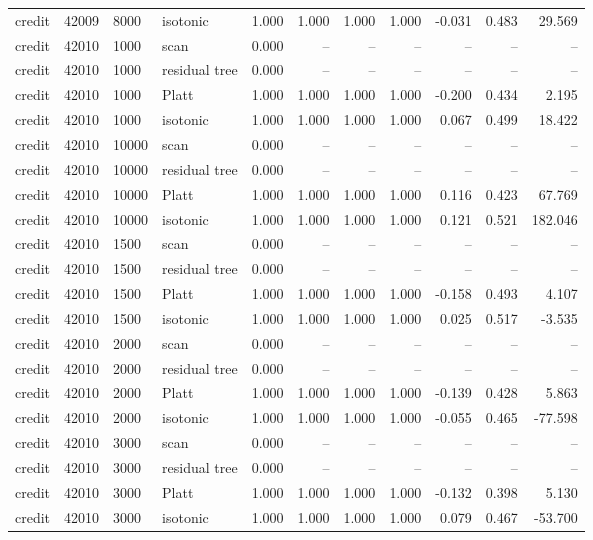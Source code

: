 \begin{tabular}{lrllrrrrrrr}
credit & 42009 & 8000 & isotonic & 1.000 & 1.000 & 1.000 & 1.000 & -0.031 & 0.483 & 29.569 \\
credit & 42010 & 1000 & scan & 0.000 & -- & -- & -- & -- & -- & -- \\
credit & 42010 & 1000 & residual tree & 0.000 & -- & -- & -- & -- & -- & -- \\
credit & 42010 & 1000 & Platt & 1.000 & 1.000 & 1.000 & 1.000 & -0.200 & 0.434 & 2.195 \\
credit & 42010 & 1000 & isotonic & 1.000 & 1.000 & 1.000 & 1.000 & 0.067 & 0.499 & 18.422 \\
credit & 42010 & 10000 & scan & 0.000 & -- & -- & -- & -- & -- & -- \\
credit & 42010 & 10000 & residual tree & 0.000 & -- & -- & -- & -- & -- & -- \\
credit & 42010 & 10000 & Platt & 1.000 & 1.000 & 1.000 & 1.000 & 0.116 & 0.423 & 67.769 \\
credit & 42010 & 10000 & isotonic & 1.000 & 1.000 & 1.000 & 1.000 & 0.121 & 0.521 & 182.046 \\
credit & 42010 & 1500 & scan & 0.000 & -- & -- & -- & -- & -- & -- \\
credit & 42010 & 1500 & residual tree & 0.000 & -- & -- & -- & -- & -- & -- \\
credit & 42010 & 1500 & Platt & 1.000 & 1.000 & 1.000 & 1.000 & -0.158 & 0.493 & 4.107 \\
credit & 42010 & 1500 & isotonic & 1.000 & 1.000 & 1.000 & 1.000 & 0.025 & 0.517 & -3.535 \\
credit & 42010 & 2000 & scan & 0.000 & -- & -- & -- & -- & -- & -- \\
credit & 42010 & 2000 & residual tree & 0.000 & -- & -- & -- & -- & -- & -- \\
credit & 42010 & 2000 & Platt & 1.000 & 1.000 & 1.000 & 1.000 & -0.139 & 0.428 & 5.863 \\
credit & 42010 & 2000 & isotonic & 1.000 & 1.000 & 1.000 & 1.000 & -0.055 & 0.465 & -77.598 \\
credit & 42010 & 3000 & scan & 0.000 & -- & -- & -- & -- & -- & -- \\
credit & 42010 & 3000 & residual tree & 0.000 & -- & -- & -- & -- & -- & -- \\
credit & 42010 & 3000 & Platt & 1.000 & 1.000 & 1.000 & 1.000 & -0.132 & 0.398 & 5.130 \\
credit & 42010 & 3000 & isotonic & 1.000 & 1.000 & 1.000 & 1.000 & 0.079 & 0.467 & -53.700 \\

\end{tabular}
